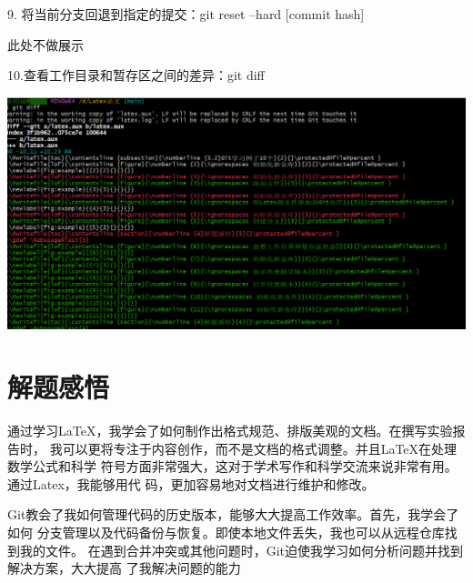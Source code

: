 \documentclass{article}
\begin{document}
9. 将当前分支回退到指定的提交：git reset --hard [commit hash]

此处不做展示

10.查看工作目录和暂存区之间的差异：git diff

\noindent
\begin{minipage}{\linewidth}
 \centering
  \includegraphics[width=0.5\linewidth]{git10.png}
  \label{fig:example}
\end{minipage}




\section{解题感悟}
通过学习LaTeX，我学会了如何制作出格式规范、排版美观的文档。在撰写实验报告时，
我可以更将专注于内容创作，而不是文档的格式调整。并且LaTeX在处理数学公式和科学
符号方面非常强大，这对于学术写作和科学交流来说非常有用。通过Latex，我能够用代
码，更加容易地对文档进行维护和修改。

Git教会了我如何管理代码的历史版本，能够大大提高工作效率。首先，我学会了如何
分支管理以及代码备份与恢复。即使本地文件丢失，我也可以从远程仓库找到我的文件。
在遇到合并冲突或其他问题时，Git迫使我学习如何分析问题并找到解决方案，大大提高
了我解决问题的能力
\end{document}
